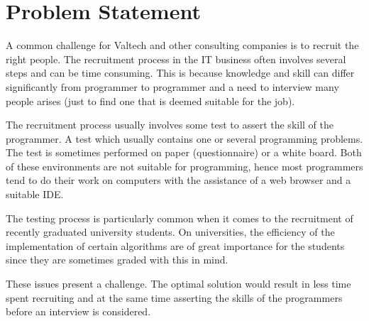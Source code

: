 \section{Problem Statement}
A common challenge for Valtech and other consulting companies is to recruit the right people. The recruitment process in the IT business often involves several steps and can be time consuming. This is because knowledge and skill can differ significantly from programmer to programmer and a need to interview many people arises (just to find one that is deemed suitable for the job).

The recruitment process usually involves some test to assert the skill of the programmer. A test which usually contains one or several programming problems. The test is sometimes performed on paper (questionnaire) or a white board. Both of these environments are not suitable for programming, hence most programmers tend to do their work on computers with the assistance of a web browser and a suitable IDE.

The testing process is particularly common when it comes to the recruitment of recently graduated university students. On universities, the efficiency of the implementation of certain algorithms are of great importance for the students since they are sometimes graded with this in mind.

These issues present a challenge. The optimal solution would result in less time spent recruiting and at the same time asserting the skills of the programmers before an interview is considered.
